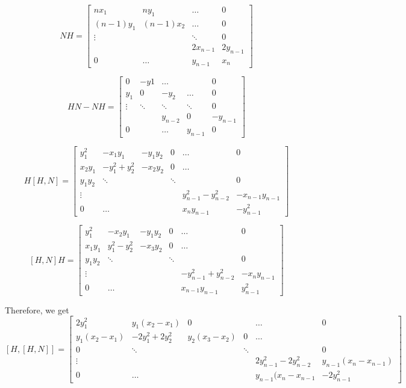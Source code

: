 \[ 
NH = \begin{bmatrix}
        nx_1 & ny_1 & \hdots & 0 \\
        (n-1)y_1 & (n-1)x_2 & \hdots & 0 \\
        \vdots & & \ddots & 0\\
         &  & 2x_{n-1} & 2y_{n-1} \\
        0 & \hdots & y_{n-1} & x_n

    \end{bmatrix}
\]

\[ 
HN-NH = \begin{bmatrix}
        0 & -y1 & \hdots &  & 0 \\
        y_1 & 0 & -y_2 & \hdots & 0 \\
        \vdots & \ddots & \ddots & \ddots & 0\\
         & & y_{n-2}& 0 & -y_{n-1} \\
        0 & & \hdots & y_{n-1} & 0

    \end{bmatrix}
\]

\[ 
H[H,N] = \begin{bmatrix}
        y_1^2 & -x_1y_1 & -y_1y_2 & 0 &\hdots & 0 \\
        x_2y_1 & -y_1^2+y^2_2 & -x_2y_2 & 0 &\hdots & \\
        y_1y_2 & \ddots & & \ddots & & 0\\
        \vdots &  &  &  & y^2_{n-1}-y^2_{n-2} & -x_{n-1}y_{n-1} \\
        0 & \hdots & & & x_ny_{n-1} & -y^2_{n-1}

    \end{bmatrix}
\]

\[ 
[H,N]H = \begin{bmatrix}
        y_1^2 & -x_2y_1 & -y_1y_2 & 0 &\hdots & 0 \\
        x_1y_1 & y_1^2-y^2_2 & -x_3y_2 & 0 &\hdots & \\
        y_1y_2 & \ddots & & \ddots & & 0\\
        \vdots &  &  &  & -y^2_{n-1}+y^2_{n-2} & -x_{n}y_{n-1} \\
        0 & \hdots & & & x_{n-1}y_{n-1} & y^2_{n-1}

    \end{bmatrix}
\]

Therefore, we get 
\[ 
[H,[H,N]] = \begin{bmatrix}
        2y_1^2 & y_1(x_2-x_1) & 0 & &\hdots & 0 \\
        y_1(x_2-x_1) & -2y_1^2+2y^2_2 & y_2(x_3-x_2) & 0 &\hdots & \\
        0 & \ddots & & \ddots & & 0\\
        \vdots &  &  &  & 2y^2_{n-1}-2y^2_{n-2} & y_{n-1}(x_{n}-x_{n-1}) \\
        0 & \hdots & & & y_{n-1}(x_{n}-x_{n-1} & -2y^2_{n-1}

    \end{bmatrix}
\]

